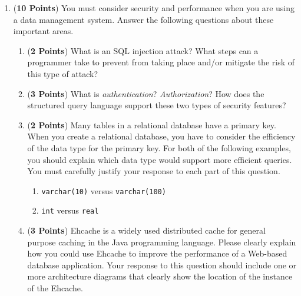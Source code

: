 \documentclass[12pt]{article}
\begin{document}
\begin{enumerate}
\begin{enumerate}
    \end{enumerate}

\newpage

\item ({\bf 10 Points}) You must consider security and performance
  when you are using a data management system.  Answer the following
  questions about these important areas.

  \begin{enumerate}
    
    \item ({\bf 2 Points}) What is an SQL injection attack? What steps
      can a programmer take to prevent from taking place and/or
      mitigate the risk of this type of attack?

    \item ({\bf 3 Points}) What is {\em authentication}?  {\em
      Authorization}?  How does the structured query language support
      these two types of security features?


    \item ({\bf 2 Points}) Many tables in a relational database have a
      primary key.  When you create a relational database, you have to
      consider the efficiency of the data type for the primary key.
      For both of the following examples, you should explain which
      data type would support more efficient queries.  You must
      carefully justify your response to each part of this question.

      \begin{enumerate}

      \item {\tt varchar(10)} versus {\tt varchar(100)}

      \item {\tt int} versus {\tt real}

      \end{enumerate}

    \item ({\bf 3 Points}) Ehcache is a widely used distributed cache
      for general purpose caching in the Java programming language.
      Please clearly explain how you could use Ehcache to improve the
      performance of a Web-based database application.  Your response
      to this question should include one or more architecture
      diagrams that clearly show the location of the instance of the
      Ehcache.


\end{enumerate}
\end{enumerate}
\end{document}
